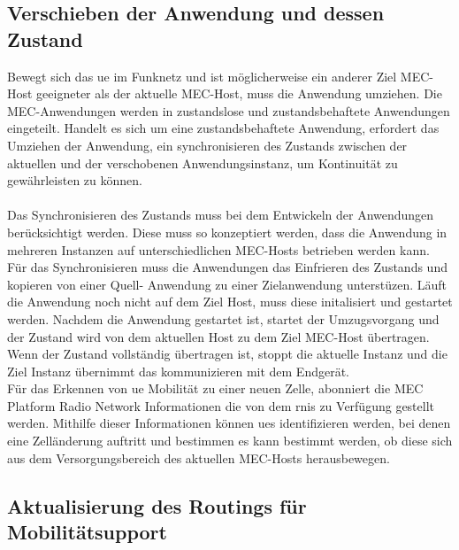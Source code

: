 \documentclass[runningheads]{llncs}
\numberwithin{figure}{section}
\begin{document}
\subsection{Verschieben der Anwendung und dessen Zustand}
Bewegt sich das \acrshort{ue} im Funknetz und ist möglicherweise ein anderer Ziel MEC-Host geeigneter als der aktuelle
MEC-Host, muss die Anwendung umziehen. Die MEC-Anwendungen werden in zustandslose und zustandsbehaftete Anwendungen eingeteilt.
Handelt es sich um eine zustandsbehaftete Anwendung, 
erfordert das Umziehen der Anwendung, ein synchronisieren des Zustands zwischen der aktuellen und der
verschobenen Anwendungsinstanz, um Kontinuität zu gewährleisten zu können.
\\
\\
Das Synchronisieren des Zustands muss bei dem Entwickeln der Anwendungen berücksichtigt werden. Diese muss so konzeptiert werden, 
dass die Anwendung in mehreren Instanzen auf unterschiedlichen MEC-Hosts betrieben werden kann. 
Für das Synchronisieren muss die Anwendungen das Einfrieren des Zustands und kopieren von einer Quell- Anwendung 
zu einer Zielanwendung unterstüzen. 
Läuft die Anwendung noch nicht auf dem Ziel Host, muss diese initalisiert und gestartet werden.
Nachdem die Anwendung gestartet ist, startet der Umzugsvorgang und der Zustand wird von dem aktuellen 
Host zu dem Ziel MEC-Host übertragen. Wenn der Zustand vollständig übertragen ist, stoppt die aktuelle Instanz
und die Ziel Instanz übernimmt das kommunizieren mit dem Endgerät. \cite{DevelopingSoftwareMultiAccess}
\\
Für das Erkennen von \acrshort{ue} Mobilität zu einer neuen Zelle, abonniert die MEC Platform Radio Network Informationen die von dem \acrfull{rnis} zu
Verfügung gestellt werden. Mithilfe dieser Informationen können \acrshort{ue}s identifizieren werden, bei denen eine Zelländerung auftritt 
und bestimmen es kann bestimmt werden, ob diese sich aus dem Versorgungsbereich des aktuellen MEC-Hosts herausbewegen.
\subsection{Aktualisierung des Routings für Mobilitätsupport}
\end{document}
